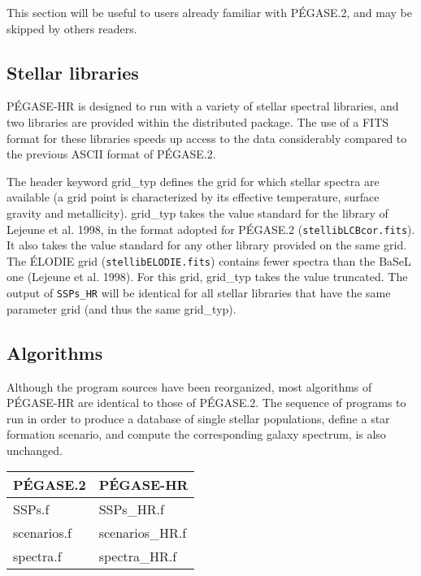 \documentclass[11pt,fleqn]{article}
\begin{document}
This section will be useful to users already familiar with P\'EGASE.2, and may be skipped by others readers.

\subsection{Stellar libraries}

P\'EGASE-HR is designed to run with a variety of stellar spectral libraries,
and two libraries are provided within the distributed package. The use of a FITS
format for these libraries speeds up access to the data considerably compared to
the previous ASCII format of P\'EGASE.2. 

The header keyword {\sc grid\_typ} defines the grid for which stellar 
spectra are available (a grid point is characterized by its effective temperature,
surface gravity and metallicity). {\sc grid\_typ} takes
the value {\sc standard} for the library of Lejeune et al. 1998, in the format
adopted for P\'EGASE.2 (\texttt{stellibLCBcor.fits}). It also takes the value {\sc standard}
for any other library provided on the same grid. \\
The \'ELODIE grid (\texttt{stellibELODIE.fits}) contains fewer spectra than the BaSeL one (Lejeune et
al. 1998). For this grid, {\sc grid\_typ} takes the value {\sc truncated}.
The output of {\texttt{SSPs\_HR}} will be identical for all stellar libraries that have 
the same parameter grid (and thus the same {\sc grid\_typ}). 


\subsection{Algorithms}

Although the program sources have been reorganized, most algorithms of P\'EGASE-HR
are identical to those of P\'EGASE.2. The sequence of programs to run in order 
to produce a database of single stellar populations, define a star formation
scenario, and compute the corresponding galaxy spectrum, is also unchanged. 

\begin{center}
\begin{tabular}{ll}
P\'EGASE.2 & P\'EGASE-HR \\ \hline 
SSPs.f & SSPs\_HR.f \\
scenarios.f & scenarios\_HR.f \\
spectra.f & spectra\_HR.f \\ \hline
\end{tabular}
\end{center}
\end{document}

